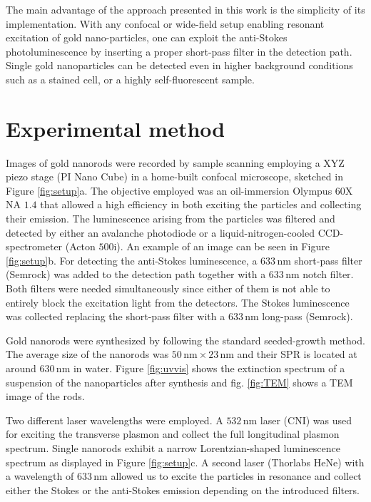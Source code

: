 \documentclass[journal=nalefd,manuscript=letter]{achemso}
\newcommand{\nm}{\ensuremath{\,\textrm{nm}}}
\begin{document}
The main advantage of the approach presented in this work is the simplicity of
its implementation. With any confocal or wide-field setup enabling resonant
excitation of gold nano-particles, one can exploit the anti-Stokes
photoluminescence by inserting a proper short-pass filter in the detection path.
Single gold nanoparticles can be detected even in higher background conditions
such as a stained cell, or a highly self-fluorescent sample.

\section{Experimental method}
Images of gold nanorods were recorded by sample scanning employing a XYZ piezo
stage (PI Nano Cube) in a  home-built confocal microscope, sketched in Figure
\ref{fig:setup}a. The objective employed was an oil-immersion Olympus 60X NA
$1.4$ that allowed a high efficiency in both exciting the particles and
collecting their emission. The luminescence arising from the particles was
filtered and detected by either an avalanche photodiode or a
liquid-nitrogen-cooled CCD-spectrometer (Acton $500\textrm{i}$). An example of
an image can be seen in Figure \ref{fig:setup}b. For detecting the anti-Stokes
luminescence, a $633\nm$ short-pass filter (Semrock) was added to the detection
path together with a $633\nm$ notch filter. Both filters were needed
simultaneously since either of them is not able to entirely block the excitation
light from the detectors. The Stokes luminescence was collected replacing the
short-pass filter with a $633\nm$ long-pass (Semrock).

Gold nanorods were synthesized by following the standard seeded-growth
method\cite{Nikoobakht2003}. The average size of the nanorods was $50\nm\times
23\nm$ and their SPR is located at around $630\nm$ in water. Figure
\ref{fig:uvvis} shows the extinction spectrum of a suspension of the
nanoparticles after synthesis and fig. \ref{fig:TEM} shows a TEM image of the
rods.

Two different laser wavelengths were employed. A $532\nm$ laser (CNI) was used
for exciting the transverse plasmon and collect the full longitudinal plasmon
spectrum. Single nanorods exhibit a narrow Lorentzian-shaped luminescence
spectrum as displayed in Figure \ref{fig:setup}c. A second laser (Thorlabs HeNe)
with a wavelength of $633\nm$ allowed us to excite the particles in resonance
and collect either the Stokes or the anti-Stokes emission depending on the
introduced filters.
\end{document}
